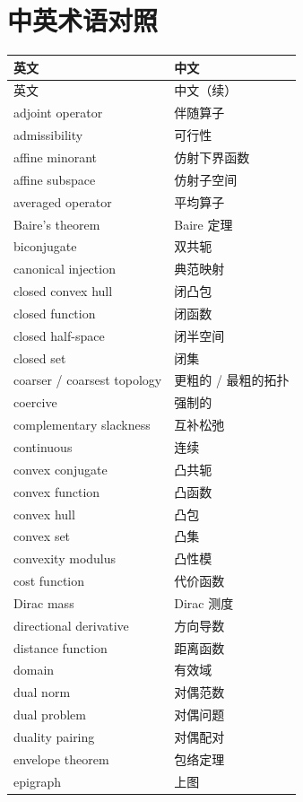 \chapter{中英术语对照}
\begin{longtable}{ll}
\toprule
英文 & 中文 \\
\midrule
\endfirsthead
\toprule
英文 & 中文（续） \\
\midrule
\endhead
\bottomrule
\endfoot
adjoint operator & 伴随算子 \\
admissibility & 可行性 \\
affine minorant & 仿射下界函数 \\
affine subspace & 仿射子空间 \\
averaged operator & 平均算子 \\
Baire's theorem & Baire 定理 \\
biconjugate & 双共轭 \\
canonical injection & 典范映射 \\
closed convex hull & 闭凸包 \\
closed function & 闭函数 \\
closed half-space & 闭半空间 \\
closed set & 闭集 \\
coarser / coarsest topology & 更粗的 / 最粗的拓扑 \\
coercive & 强制的 \\
complementary slackness & 互补松弛 \\
continuous & 连续 \\
convex conjugate & 凸共轭 \\
convex function & 凸函数 \\
convex hull & 凸包 \\
convex set & 凸集 \\
convexity modulus & 凸性模 \\
cost function & 代价函数 \\
Dirac mass & Dirac 测度 \\
directional derivative & 方向导数 \\
distance function & 距离函数 \\
domain & 有效域 \\
dual norm & 对偶范数 \\
dual problem & 对偶问题 \\
duality pairing & 对偶配对 \\
envelope theorem & 包络定理 \\
epigraph & 上图 \\

\end{longtable}
